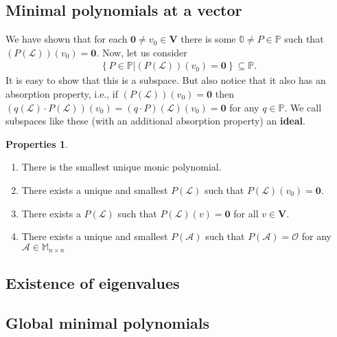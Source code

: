 \documentclass{article}
\theoremstyle{definition}
\newtheorem{prop}{Properties}[section]
\newcommand{\V}{\mathbf{V}}
\newcommand{\lag}{\mathcal{L}}
\begin{document}
\subsection{Minimal polynomials at a vector}

We have shown that for each $\mathbf{0} \neq v_0 \in \V$ there is some $\mathbb{0} \neq P \in \mathbb{P}$ such that $(P(\lag))(v_0) = \mathbf{0}$. Now, let us consider
\begin{align*}
\left\{ 
P \in \mathbb{P} 
\bigg\vert
(P(\lag))(v_0) = \mathbf{0}  
\right\} 
\subseteq \mathbb{P}.
\end{align*}
It is easy to show that this is a subspace. But also notice that it also has an absorption property, i.e., if $(P(\lag))(v_0) = \mathbf{0} $ then $(q(\lag) \cdot P(\lag))(v_0) = (q\cdot P)(\lag)(v_0) = \mathbf{0}  $ for any $q\in \mathbb{P}$. We call subspaces like these (with an additional absorption property) an \textbf{ideal}. 

\begin{prop}
	$\,$
	\begin{enumerate}
	\item There is the smallest unique monic polynomial.
	\item There exists a unique and smallest $P(\lag)$ such that $P(\lag)(v_0) = \mathbf{0}$. 
	\item There exists a $P(\lag)$ such that $P(\lag)(v) = \mathbf{0}$ for all $v\in \V$.
	\item There exists a unique and smallest $P(\mathcal{A})$ such that $P(\mathcal{A}) = \mathcal{O}$ for any $\mathcal{A} \in \mathbb{M}_{n\times n}$ 
\end{enumerate}
\end{prop}
	
	








\subsection{Existence of eigenvalues}
\subsection{Global minimal polynomials}
\end{document}
